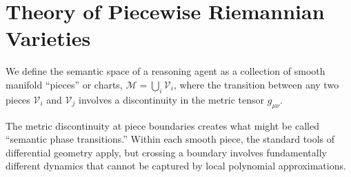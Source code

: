 \documentclass[12pt,a4paper]{article}
\begin{document}
\section{Theory of Piecewise Riemannian Varieties}

We define the semantic space of a reasoning agent as a collection of smooth manifold ``pieces'' or charts, $\mathcal{M} = \bigcup_i \mathcal{V}_i$, where the transition between any two pieces $\mathcal{V}_i$ and $\mathcal{V}_j$ involves a discontinuity in the metric tensor $g_{\mu\nu}$.

The metric discontinuity at piece boundaries creates what might be called ``semantic phase transitions.'' Within each smooth piece, the standard tools of differential geometry apply, but crossing a boundary involves fundamentally different dynamics that cannot be captured by local polynomial approximations.
\end{document}
